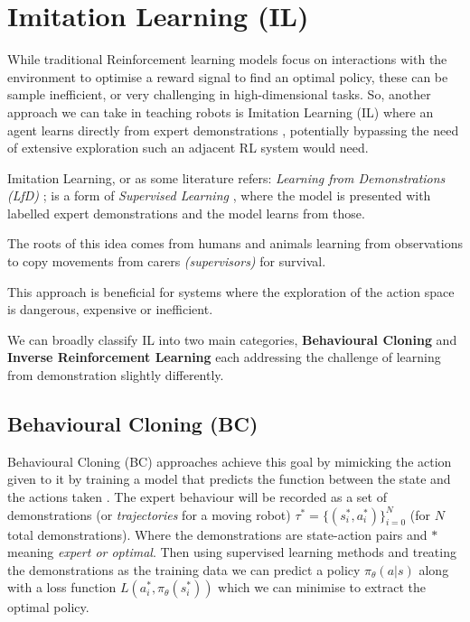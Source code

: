 \section{Imitation Learning (IL)}
\label{sec:il}
  While traditional Reinforcement learning models focus on interactions with the environment to optimise a reward signal to find an optimal policy, these can be sample inefficient, or very challenging in high-dimensional tasks. So, another approach we can take in teaching robots is Imitation Learning (IL) where an agent learns directly from expert demonstrations \cite{attia2018globaloverviewimitationlearning}, potentially bypassing the need of extensive exploration such an adjacent RL system would need.

  Imitation Learning, or as some literature refers: \emph{Learning from Demonstrations (LfD)} \cite{ARGALL2009469}; is a form of \emph{Supervised Learning} \cite{hastie2009overview,cunningham2008supervised}, where the model is presented with labelled expert demonstrations and the model learns from those.
  
  The roots of this idea comes from humans and animals \cite{bakker1996robot} learning from observations to copy movements from carers \emph{(supervisors)} for survival. 

  This approach is beneficial for systems where the exploration of the action space is dangerous, expensive or inefficient.

  We can broadly classify IL into two main categories, \textbf{Behavioural Cloning} and \textbf{Inverse Reinforcement Learning} each addressing the challenge of learning from demonstration slightly differently.


\subsection{Behavioural Cloning (BC)}
\label{subsec:bc}
 Behavioural Cloning (BC) approaches achieve this goal by  mimicking the action given to it by training a model that predicts the function between the state and the actions taken  \cite{pomerlau1991neco.1991.3.1.88, ross2011reductionimitationlearningstructured}. The expert behaviour will be recorded as a set of demonstrations (or \emph{trajectories} for a moving robot) $\tau^* = \lbrace(s_i^*, a_i^*)\rbrace_{i = 0}^N$ (for $N$ total demonstrations). Where the demonstrations are state-action pairs and \emph{$*$} meaning \emph{expert or optimal}.
 Then using supervised learning methods and treating the demonstrations as the training  data we can predict a policy $\pi_\theta\left(a | s\right)$ along with a loss function $L \left( a_i^*, \pi_\theta\left(s_i^*\right) \right)$  which we can minimise to extract the optimal policy. 

